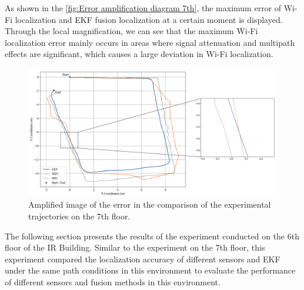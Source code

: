 \documentclass[12pt,a4paper]{article}
\numberwithin{equation}{section}
\begin{document}
\noindent As shown in the \autoref{fig:Error amplification diagram 7th}, the maximum error of Wi-Fi localization and EKF fusion localization at a certain moment is displayed. Through the local magnification, we can see that the maximum Wi-Fi localization error mainly occurs in areas where signal attenuation and multipath effects are significant, which causes a large deviation in Wi-Fi localization.
\begin{figure}[H]
    \centering
    \includegraphics[width=1\linewidth]{Amplification images/wifi/half_circle_large_diff.png}
    \caption{Amplified image of the error in the comparison of the experimental trajectories on the 7th floor.}
    \label{fig:Error amplification diagram 7th}
\end{figure}
\noindent The following section presents the results of the experiment conducted on the 6th floor of the IR Building. Similar to the experiment on the 7th floor, this experiment compared the localization accuracy of different sensors and EKF under the same path conditions in this environment to evaluate the performance of different sensors and fusion methods in this environment.
\end{document}
